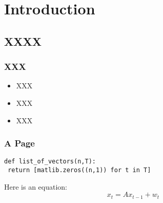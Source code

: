 \documentclass{beamer}
\title{\talktitle}
\author{\Us}
\date{\today}
\begin{document}
\frame{\titlepage}

\section[Outline]{}
\frame{\tableofcontents}

\section{Introduction}
\subsection{XXXX}
\frame
{
  \frametitle{XXX}

  \begin{itemize}
  \item<1-> XXX
  \item<2-> XXX
  \item<3-> XXX      
  \end{itemize}
}

\frame
{
  \sudokuexampleone
}

\begin{frame}[fragile]
\frametitle{A Page}
\begin{lstlisting}
def list_of_vectors(n,T):
 return [matlib.zeros((n,1)) for t in T]
\end{lstlisting}
 Here is an equation:
\begin{equation}
 x_t = Ax_{t-1} + w_t
\end{equation}
\end{frame}
\end{document}
